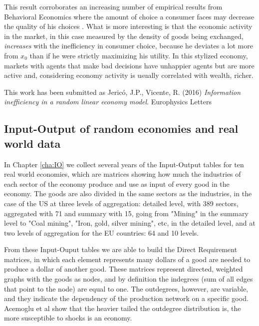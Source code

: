 This result corroborates an increasing number of empirical results from Behavioral Economics where the amount of choice a consumer faces may decrease the quality of his choices \cite{Lepper00, Schwartz02}. What is more interesting is that the economic activity in the market, in this case measured by the density of goods being exchanged, \textit{increases} with the inefficiency in consumer choice, because he deviates a lot more from $x_0$ than if he were strictly maximizing his utility. In this stylized economy, markets with agents that make bad decisions have unhappier agents but are more active and, considering economy activity is usually correlated with wealth, richer.

This work has been submitted as Jericó, J.P., Vicente, R. (2016) \emph{Information inefficiency in a random linear economy model}. Europhysics Letters



\subsection{Input-Output of random economies and real world data}

In Chapter \ref{cha:IO} we collect several years of the Input-Output tables for ten real world economies, which are matrices showing how much the industries of each sector of the economy produce and use as input of every good in the economy. The goods are also divided in the same sectors as the industries, in the case of the US at three levels of aggregation: detailed level, with 389 sectors, aggregated with 71 and summary with 15, going from "Mining" in the summary level to "Coal mining", "Iron, gold, silver mining", etc, in the detailed level, and at two levels of aggregation for the EU countries: 64 and 10 levels.

From these Input-Ouput tables we are able to build the Direct Requirement matrices, in which each element represents many dollars of a good are needed to produce a dollar of another good. These matrices represent directed, weighted graphs with the goods as nodes, and by definition the indegrees (sum of all edges that point to the node) are equal to one. The outdegrees, however, are variable, and they indicate the dependency of the production network on a specific good. Acemoglu et al \cite{Acemoglu12} show that the heavier tailed the outdegree distribution is, the more susceptible to shocks is an economy.

